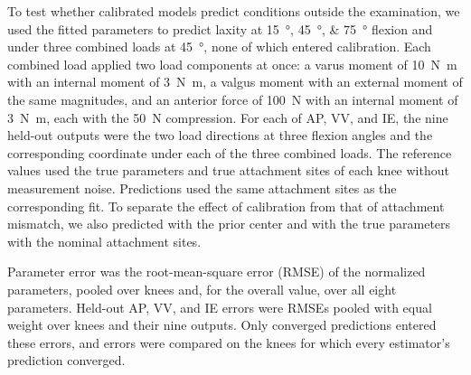 To test whether calibrated models predict conditions outside the examination, we used the fitted parameters to predict laxity at \SIlist{15;45;75}{\degree} flexion and under three combined loads at \SI{45}{\degree}, none of which entered calibration.
Each combined load applied two load components at once: a varus moment of \SI{10}{\newton\meter} with an internal moment of \SI{3}{\newton\meter}, a valgus moment with an external moment of the same magnitudes, and an anterior force of \SI{100}{\newton} with an internal moment of \SI{3}{\newton\meter}, each with the \SI{50}{\newton} compression.
For each of AP, VV, and IE, the nine held-out outputs were the two load directions at three flexion angles and the corresponding coordinate under each of the three combined loads.
The reference values used the true parameters and true attachment sites of each knee without measurement noise.
Predictions used the same attachment sites as the corresponding fit.
To separate the effect of calibration from that of attachment mismatch, we also predicted with the prior center and with the true parameters with the nominal attachment sites.

Parameter error was the root-mean-square error (RMSE) of the normalized parameters, pooled over knees and, for the overall value, over all eight parameters.
Held-out AP, VV, and IE errors were RMSEs pooled with equal weight over knees and their nine outputs.
Only converged predictions entered these errors, and errors were compared on the knees for which every estimator's prediction converged.



